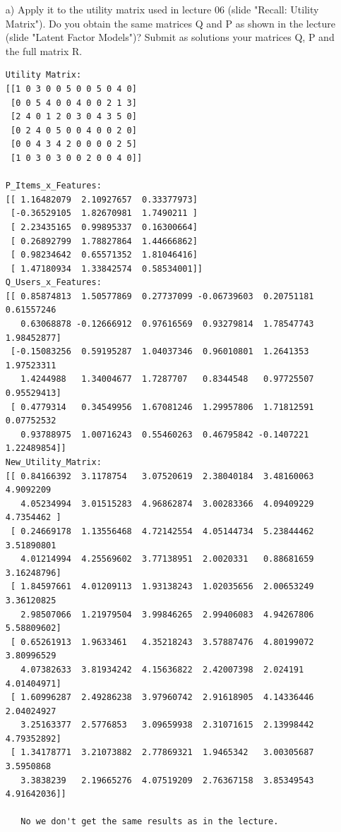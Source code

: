 \documentclass[11pt,a4paper]{scrartcl}
\begin{document}
\begin{itemize}
	\item [a)] Apply it to the utility matrix used in lecture 06 (slide "Recall: Utility Matrix"). Do you obtain the same matrices Q and P as shown in the lecture (slide "Latent Factor Models")? Submit as solutions your matrices Q, P and the full matrix R.

\begin{verbatim}	
Utility Matrix:
[[1 0 3 0 0 5 0 0 5 0 4 0]
 [0 0 5 4 0 0 4 0 0 2 1 3]
 [2 4 0 1 2 0 3 0 4 3 5 0]
 [0 2 4 0 5 0 0 4 0 0 2 0]
 [0 0 4 3 4 2 0 0 0 0 2 5]
 [1 0 3 0 3 0 0 2 0 0 4 0]]

P_Items_x_Features:
[[ 1.16482079  2.10927657  0.33377973]
 [-0.36529105  1.82670981  1.7490211 ]
 [ 2.23435165  0.99895337  0.16300664]
 [ 0.26892799  1.78827864  1.44666862]
 [ 0.98234642  0.65571352  1.81046416]
 [ 1.47180934  1.33842574  0.58534001]]
Q_Users_x_Features:
[[ 0.85874813  1.50577869  0.27737099 -0.06739603  0.20751181  0.61557246
   0.63068878 -0.12666912  0.97616569  0.93279814  1.78547743  1.98452877]
 [-0.15083256  0.59195287  1.04037346  0.96010801  1.2641353   1.97523311
   1.4244988   1.34004677  1.7287707   0.8344548   0.97725507  0.95529413]
 [ 0.4779314   0.34549956  1.67081246  1.29957806  1.71812591  0.07752532
   0.93788975  1.00716243  0.55460263  0.46795842 -0.1407221   1.22489854]]
New_Utility_Matrix:
[[ 0.84166392  3.1178754   3.07520619  2.38040184  3.48160063  4.9092209
   4.05234994  3.01515283  4.96862874  3.00283366  4.09409229  4.7354462 ]
 [ 0.24669178  1.13556468  4.72142554  4.05144734  5.23844462  3.51890801
   4.01214994  4.25569602  3.77138951  2.0020331   0.88681659  3.16248796]
 [ 1.84597661  4.01209113  1.93138243  1.02035656  2.00653249  3.36120825
   2.98507066  1.21979504  3.99846265  2.99406083  4.94267806  5.58809602]
 [ 0.65261913  1.9633461   4.35218243  3.57887476  4.80199072  3.80996529
   4.07382633  3.81934242  4.15636822  2.42007398  2.024191    4.01404971]
 [ 1.60996287  2.49286238  3.97960742  2.91618905  4.14336446  2.04024927
   3.25163377  2.5776853   3.09659938  2.31071615  2.13998442  4.79352892]
 [ 1.34178771  3.21073882  2.77869321  1.9465342   3.00305687  3.5950868
   3.3838239   2.19665276  4.07519209  2.76367158  3.85349543  4.91642036]]
   
   No we don't get the same results as in the lecture.
   

\end{verbatim}
\end{itemize}
\end{document}
